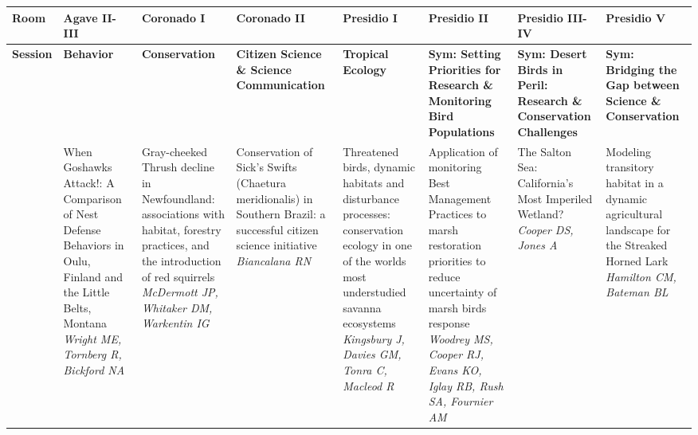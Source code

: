 \begin{tabular}{|x{0.85cm}|x{2.85cm}|x{2.85cm}|x{2.85cm}|x{2.85cm}|a{2.85cm}|a{2.85cm}|a{2.85cm}|}\hline
Room & Agave II-III & Coronado I & Coronado II & Presidio I & Presidio II & Presidio III-IV & Presidio V\\
\hline
\rule{0pt}{1em} \textbf{Session} &\footnotesize \textbf{Behavior} & \footnotesize \textbf{Conservation} & \footnotesize \textbf{Citizen Science \& Science Communication} & \footnotesize \textbf{Tropical Ecology} & \footnotesize \textbf{Sym: Setting Priorities for Research \& Monitoring Bird Populations} & \footnotesize \textbf{Sym: Desert Birds in Peril: Research \& Conservation Challenges} & \footnotesize \textbf{Sym: Bridging the Gap between Science \& Conservation}\\
\hline
{}&When Goshawks Attack!: A Comparison of Nest Defense Behaviors in Oulu, Finland and the Little Belts, Montana \newline \newline \textit{Wright ME, Tornberg R, Bickford NA} & Gray-cheeked Thrush decline in Newfoundland: associations with habitat, forestry practices, and the introduction of red squirrels \newline \newline \textit{McDermott JP, Whitaker DM, Warkentin IG} & Conservation of Sick's Swifts (Chaetura meridionalis) in Southern Brazil: a successful citizen science initiative \newline \newline \textit{Biancalana RN} & Threatened birds, dynamic habitats and disturbance processes: conservation ecology in one of the worlds most understudied savanna ecosystems \newline \newline \textit{Kingsbury J, Davies GM, Tonra C, Macleod R} & Application of monitoring Best Management Practices to marsh restoration priorities to reduce uncertainty of marsh birds response \newline \newline \textit{Woodrey MS, Cooper RJ, Evans KO, Iglay RB, Rush SA, Fournier AM} & The Salton Sea: California's Most Imperiled Wetland? \newline \newline \textit{Cooper DS, Jones A} & Modeling transitory habitat in a dynamic agricultural landscape for the Streaked Horned Lark \newline \newline \textit{Hamilton CM, Bateman BL}\\

\end{tabular}

